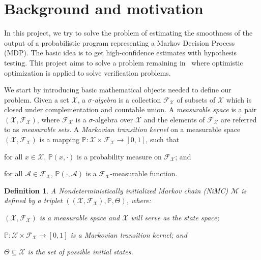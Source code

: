 \documentclass[12pt]{article}
\newtheorem{definition}{Definition}
\newcommand{\M}{\mathcal{M}}
\newcommand{\X}{\mathcal{X}}
\newcommand{\F}{\mathcal{F}}
\newcommand{\modelname}{NiMC\xspace}
\begin{document}
\section{Background and motivation}
In this project, we try to solve the problem of estimating the smoothness of the output of a probabilistic program representing a Markov Decision Process (MDP). The basic idea is to get high-confidence estimates with hypothesis testing. This project aims to solve a problem remaining in~\cite{musavi2019verification} where optimistic optimization is applied to solve verification problems.

We start by introducing basic mathematical objects needed to define our problem. Given a set $\X$, a {\em $\sigma$-algebra} is a collection $\F_\X$ of subsets of $\X$ which is closed under complementation and countable union. A {\em measurable space\/} is a pair $(\X, \F_\X)$, where $\F_\X$ is a $\sigma$-algebra over $\X$ and the elements of $\F_\X$ are referred to as {\em measurable sets}. A {\em Markovian transition kernel} on a measurable space $(\X, \F_\X)$ is  a mapping $\mathbb{P}:\X \times \F_\X \rightarrow [0, 1]$, such that \begin{inparaenum}[(i)] \item for all $x \in \X$, $\mathbb{P}(x, \cdot)$ is a probability measure on $\F_\X$; and \item for all $\mathcal{A} \in \F_\X$, $\mathbb{P}(\cdot, \mathcal{A})$ is a $\F_\X$-measurable function. \end{inparaenum}

\begin{definition}
\label{def:mpis}
A {\em Nondeterministically initialized Markov chain (\modelname)\/} $\M$ is defined by a triplet $((\X, \F_\X), \mathbb{P}, \Theta)$, where:
\begin{inparaenum}[(i)]
\item $(\X, \F_\X)$ is a measurable space and $\X$ will serve as the state space;
\item $\mathbb{P}:\X \times \F_\X \rightarrow [0, 1]$ is a Markovian {\em transition kernel}; and
\item $\Theta \subseteq \X$ is the set of possible initial states.
\end{inparaenum}
\end{definition}
\end{document}
